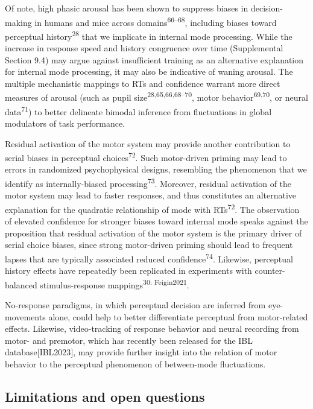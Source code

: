 \documentclass[
]{article}
\begin{document}
Of note, high phasic arousal has been shown to suppress biases in
decision-making in humans and mice across
domains\textsuperscript{66--68}, including biases toward perceptual
history\textsuperscript{28} that we implicate in internal mode
processing. While the increase in response speed and history congruence
over time (Supplemental Section 9.4) may argue against insufficient
training as an alternative explanation for internal mode processing, it
may also be indicative of waning arousal. The multiple mechanistic
mappings to RTs and confidence warrant more direct measures of arousal
(such as pupil size\textsuperscript{28,65,66,68--70}, motor
behavior\textsuperscript{69,70}, or neural data\textsuperscript{71}) to
better delineate bimodal inference from fluctuations in global
modulators of task performance.

Residual activation of the motor system may provide another contribution
to serial biases in perceptual choices\textsuperscript{72}. Such
motor-driven priming may lead to errors in randomized psychophysical
designs, resembling the phenomenon that we identify as internally-biased
processing\textsuperscript{73}. Moreover, residual activation of the
motor system may lead to faster responses, and thus constitutes an
alternative explanation for the quadratic relationship of mode with
RTs\textsuperscript{72}. The observation of elevated confidence for
stronger biases toward internal mode speaks against the proposition that
residual activation of the motor system is the primary driver of serial
choice biases, since strong motor-driven priming should lead to frequent
lapses that are typically associated reduced
confidence\textsuperscript{74}. Likewise, perceptual history effects
have repeatedly been replicated in experiments with counter-balanced
stimulus-response mappings\textsuperscript{30: Feigin2021}.

No-response paradigms, in which perceptual decision are inferred from
eye-movements alone, could help to better differentiate perceptual from
motor-related effects. Likewise, video-tracking of response behavior and
neural recording from motor- and premotor, which has recently been
released for the IBL database{[}IBL2023{]}, may provide further insight
into the relation of motor behavior to the perceptual phenomenon of
between-mode fluctuations.

\hypertarget{limitations-and-open-questions}{%
\subsection{Limitations and open
questions}\label{limitations-and-open-questions}}
\end{document}
